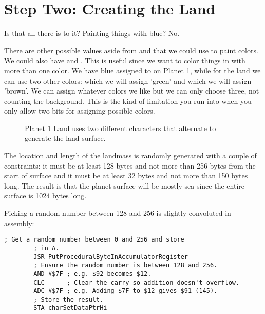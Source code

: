 

\section{Step Two: Creating the Land}

Is that all there is to it? Painting things with blue? No. 

There are other possible values aside from  and  that we
could use to paint colors. We could also have  and . This
is useful since we want to color things in with more than one color. We have
blue assigned to  on Planet 1, while for the land we can use two
other colors:  which we will assign 'green' and  which we
will assign 'brown'. We can assign whatever colors we like but we can only
choose three, not counting the background. This is the kind of limitation you
run into when you only allow two bits for assigning possible colors.

\begin{figure}[H]
{
  \setlength{\tabcolsep}{3.0pt}
  \setlength\cmidrulewidth{\heavyrulewidth} %
    \begin{adjustbox}{width=10cm,center}
  \begin{subfigure}{0.3\textwidth}
  
  \end{subfigure}
  \begin{subfigure}{0.3\textwidth}
  
  \end{subfigure}
  \end{adjustbox}
}\caption[]{Planet 1 Land uses two different characters that alternate to generate the land surface.}
\end{figure}


The location and length of the landmass is randomly generated with a couple of constraints:
it must be at least 128 bytes  and not more than 256 bytes from the start of surface and it must be at least 32 bytes
and not more than 150 bytes long. The result is that the planet surface will be mostly sea
since the entire surface is 1024 bytes long.

Picking a random number between 128 and 256 is slightly convoluted in assembly:

\begin{lstlisting}[caption=Convoluted.]
        ; Get a random number between 0 and 256 and store
        ; in A.
        JSR PutProceduralByteInAccumulatorRegister
        ; Ensure the random number is between 128 and 256.
        AND #$7F ; e.g. $92 becomes $12.
        CLC      ; Clear the carry so addition doesn't overflow.
        ADC #$7F ; e.g. Adding $7F to $12 gives $91 (145).
        ; Store the result.
        STA charSetDataPtrHi
\end{lstlisting}

